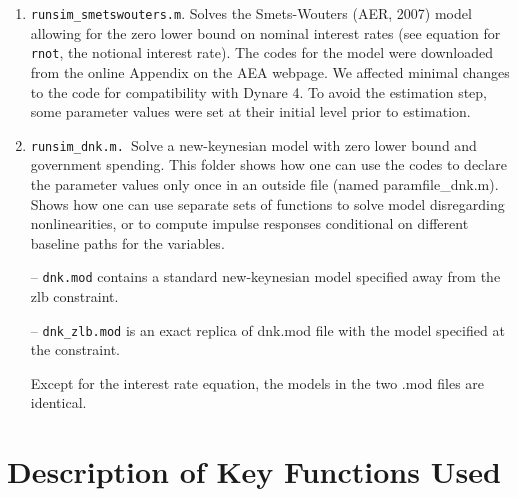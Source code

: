 \documentclass[12pt]{article}
\begin{document}
\begin{enumerate}
\item \texttt{runsim\_smetswouters.m}. Solves the Smets-Wouters (AER, 2007)
model allowing for the zero lower bound on nominal interest rates (see
equation for \texttt{rnot}, the notional interest rate). The codes for the
model were downloaded from the online Appendix on the AEA webpage. We
affected minimal changes to the code for compatibility with Dynare 4. To
avoid the estimation step, some parameter values were set at their initial
level prior to estimation.

\item \texttt{runsim\_dnk.m. }Solve a new-keynesian model with zero lower
bound and government spending. This folder shows how one can use the codes
to declare the parameter values only once in an outside file (named
paramfile\_dnk.m). Shows how one can use separate sets of functions to solve
model disregarding nonlinearities, or to compute impulse responses
conditional on different baseline paths for the variables.

-- \texttt{dnk.mod} contains a standard new-keynesian model specified away
from the zlb constraint.

-- \texttt{dnk\_zlb.mod} is an exact replica of dnk.mod file with the model
specified at the constraint.

Except for the interest rate equation, the models in the two .mod files are
identical.
\end{enumerate}

\section{Description of Key Functions Used}
\end{document}

